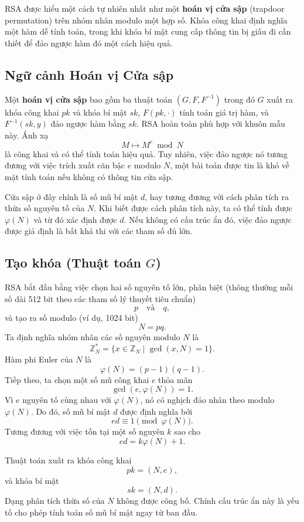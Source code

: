 RSA được hiểu một cách tự nhiên nhất như một \textbf{hoán vị cửa sập} (trapdoor permutation) trên nhóm nhân modulo một hợp số. Khóa công khai định nghĩa một hàm dễ tính toán, trong khi khóa bí mật cung cấp thông tin bị giấu đi cần thiết để đảo ngược hàm đó một cách hiệu quả.

\subsection{Ngữ cảnh Hoán vị Cửa sập}

Một \textbf{hoán vị cửa sập} bao gồm ba thuật toán $(G, F, F^{-1})$ trong đó $G$ xuất ra khóa công khai $pk$ và khóa bí mật $sk$, $F(pk, \cdot)$ tính toán giá trị hàm, và $F^{-1}(sk, y)$ đảo ngược hàm bằng $sk$. RSA hoàn toàn phù hợp với khuôn mẫu này. Ánh xạ
\[
M \mapsto M^e \bmod N
\]
là công khai và có thể tính toán hiệu quả. Tuy nhiên, việc đảo ngược nó tương đương với việc trích xuất căn bậc $e$ modulo $N$, một bài toán được tin là khó về mặt tính toán nếu không có thông tin cửa sập.

Cửa sập ở đây chính là số mũ bí mật $d$, hay tương đương với cách phân tích ra thừa số nguyên tố của $N$. Khi biết được cách phân tích này, ta có thể tính được $\varphi(N)$ và từ đó xác định được $d$. Nếu không có cấu trúc ẩn đó, việc đảo ngược được giả định là bất khả thi với các tham số đủ lớn.

\subsection{\texorpdfstring{Tạo khóa (Thuật toán $G$)}{Tạo khóa (Thuật toán G)}}

RSA bắt đầu bằng việc chọn hai số nguyên tố lớn, phân biệt (thông thường mỗi số dài 512 bit theo các tham số lý thuyết tiêu chuẩn)
\[
p \quad \text{và} \quad q,
\]
và tạo ra số modulo (ví dụ, 1024 bit)
\[
N = pq.
\]
Ta định nghĩa nhóm nhân các số nguyên modulo $N$ là
\[
\mathbb{Z}_N^{\ast} = \{x \in \mathbb{Z}_N \mid \gcd(x, N) = 1\}.
\]
Hàm phi Euler của $N$ là
\[
\varphi(N) = (p-1)(q-1).
\]
Tiếp theo, ta chọn một số mũ công khai $e$ thỏa mãn
\[
\gcd(e,\varphi(N)) = 1.
\]
Vì $e$ nguyên tố cùng nhau với $\varphi(N)$, nó có nghịch đảo nhân theo modulo $\varphi(N)$. Do đó, số mũ bí mật $d$ được định nghĩa bởi
\[
ed \equiv 1 \pmod{\varphi(N)}.
\]
Tương đương với việc tồn tại một số nguyên $k$ sao cho
\[
ed = k\varphi(N) + 1.
\]

Thuật toán xuất ra khóa công khai
\[
pk = (N,e),
\]
và khóa bí mật
\[
sk = (N,d).
\]
Dạng phân tích thừa số của $N$ không được công bố. Chính cấu trúc ẩn này là yếu tố cho phép tính toán số mũ bí mật ngay từ ban đầu.

